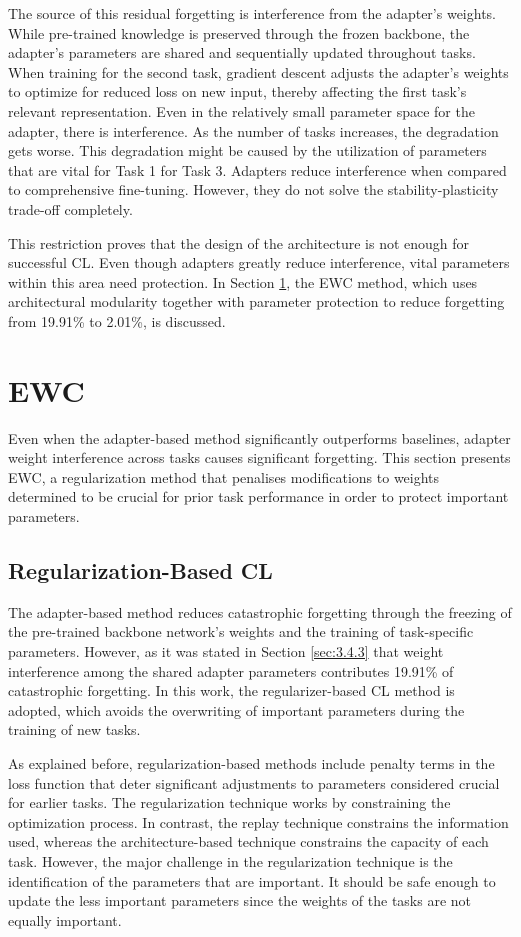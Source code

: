 \documentclass[english, LaM, oneside]{sapthesis}%
\numberwithin{equation}{chapter}
\begin{document}
The source of this residual forgetting is interference from the adapter's weights. While pre-trained knowledge is preserved through the frozen backbone, the adapter's parameters are shared and sequentially updated throughout tasks. When training for the second task, gradient descent adjusts the adapter's weights to optimize for reduced loss on new input, thereby affecting the first task's relevant representation. Even in the relatively small parameter space for the adapter, there is interference.
As the number of tasks increases, the degradation gets worse. This degradation might be caused by the utilization of parameters that are vital for Task 1 for Task 3. Adapters reduce interference when compared to comprehensive fine-tuning. However, they do not solve the stability-plasticity trade-off completely.

This restriction proves that the design of the architecture is not enough for successful CL. Even though adapters greatly reduce interference, vital parameters within this area need protection. In Section \ref{sec:3.5}, the EWC method, which uses architectural modularity together with parameter protection to reduce forgetting from 19.91\% to 2.01\%, is discussed.

\section{EWC}
\label{sec:3.5}
Even when the adapter-based method significantly outperforms baselines, adapter weight interference across tasks causes significant forgetting. This section presents EWC, a regularization method that penalises modifications to weights determined to be crucial for prior task performance in order to protect important parameters. 

\subsection{Regularization-Based CL}
The adapter-based method reduces catastrophic forgetting through the freezing of the pre-trained backbone network's weights and the training of task-specific parameters. However, as it was stated in Section \ref{sec:3.4.3} that weight interference among the shared adapter parameters contributes 19.91\% of catastrophic forgetting. In this work, the regularizer-based CL method is adopted, which avoids the overwriting of important parameters during the training of new tasks.

As explained before, regularization-based methods include penalty terms in the loss function that deter significant adjustments to parameters considered crucial for earlier tasks. The regularization technique works by constraining the optimization process. In contrast, the replay technique constrains the information used, whereas the architecture-based technique constrains the capacity of each task\cite{6}. However, the major challenge in the regularization technique is the identification of the parameters that are important. It should be safe enough to update the less important parameters since the weights of the tasks are not equally important.
\end{document}
